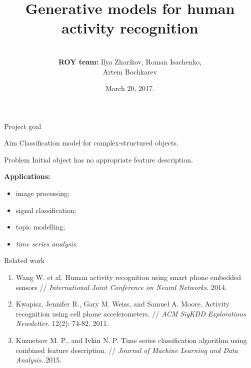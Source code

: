 \documentclass{beamer}
\title[\hbox to 56mm{Human Activity Recognition  \hfill\insertframenumber\,/\,\inserttotalframenumber}]
{Generative models for human activity recognition}
\author[ROY team]{\\
				{\small \textbf{ROY team:} Ilya Zharikov, Roman Isachenko, \\
					Artem Bochkarev}}
\institute[SkolTech]{Skolkovo Institute of Science and Technology \\
	Machine Learning course 
    \vspace{0.3cm}
}
\date{March 20, 2017.}
\begin{document}
\begin{frame}
\titlepage
\end{frame}
\begin{frame}{Project goal}
	
	\begin{block}{Aim}
		Classification model for complex-structured objects.
	\end{block}

	\begin{block}{Problem}
		Initial object has no appropriate feature description.
	\end{block}
	
	\textbf{Applications:}
	\begin{itemize}
		\item image processing;
		\item signal classification;
		\item topic modelling;
		\item \textit{time series analysis}.
	\end{itemize}
	
\end{frame}
\begin{frame}{Related work}
	\begin{enumerate}
		\item Wang W. et al. Human activity recognition using smart phone embedded sensors // \emph{International Joint Conference on Neural Networks}. 2014.
		\item Kwapisz, Jennifer R., Gary M. Weiss, and Samuel A. Moore. Activity recognition using cell phone accelerometers. // \emph{ACM SigKDD Explorations Newsletter}. 12(2): 74-82. 2011.
		\item Kuznetsov M. P., and Ivkin N. P. Time series classification algorithm using combined feature description. // \emph{Journal of Machine Learning and Data Analysis}. 2015.
	\end{enumerate}
	
\end{frame}
\end{document}
